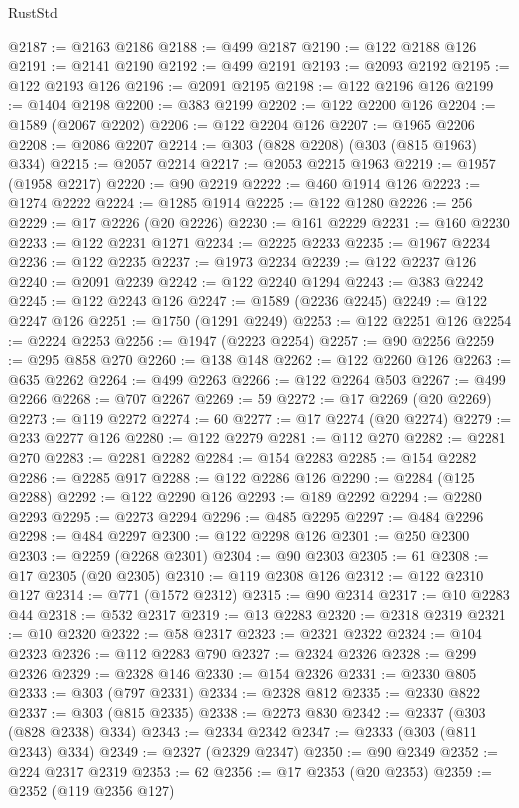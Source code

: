\begin{lexlean}{RustStd}
\begin{coremodule}
@2187 := @2163 @2186
@2188 := @499 @2187
@2190 := @122 @2188 @126
@2191 := @2141 @2190
@2192 := @499 @2191
@2193 := @2093 @2192
@2195 := @122 @2193 @126
@2196 := @2091 @2195
@2198 := @122 @2196 @126
@2199 := @1404 @2198
@2200 := @383 @2199
@2202 := @122 @2200 @126
@2204 := @1589 (@2067 @2202)
@2206 := @122 @2204 @126
@2207 := @1965 @2206
@2208 := @2086 @2207
@2214 := @303 (@828 @2208) (@303 (@815 @1963) @334)
@2215 := @2057 @2214
@2217 := @2053 @2215 @1963
@2219 := @1957 (@1958 @2217)
@2220 := @90 @2219
@2222 := @460 @1914 @126
@2223 := @1274 @2222
@2224 := @1285 @1914
@2225 := @122 @1280
@2226 := 256
@2229 := @17 @2226 (@20 @2226)
@2230 := @161 @2229
@2231 := @160 @2230
@2233 := @122 @2231 @1271
@2234 := @2225 @2233
@2235 := @1967 @2234
@2236 := @122 @2235
@2237 := @1973 @2234
@2239 := @122 @2237 @126
@2240 := @2091 @2239
@2242 := @122 @2240 @1294
@2243 := @383 @2242
@2245 := @122 @2243 @126
@2247 := @1589 (@2236 @2245)
@2249 := @122 @2247 @126
@2251 := @1750 (@1291 @2249)
@2253 := @122 @2251 @126
@2254 := @2224 @2253
@2256 := @1947 (@2223 @2254)
@2257 := @90 @2256
@2259 := @295 @858 @270
@2260 := @138 @148
@2262 := @122 @2260 @126
@2263 := @635 @2262
@2264 := @499 @2263
@2266 := @122 @2264 @503
@2267 := @499 @2266
@2268 := @707 @2267
@2269 := 59
@2272 := @17 @2269 (@20 @2269)
@2273 := @119 @2272
@2274 := 60
@2277 := @17 @2274 (@20 @2274)
@2279 := @233 @2277 @126
@2280 := @122 @2279
@2281 := @112 @270
@2282 := @2281 @270
@2283 := @2281 @2282
@2284 := @154 @2283
@2285 := @154 @2282
@2286 := @2285 @917
@2288 := @122 @2286 @126
@2290 := @2284 (@125 @2288)
@2292 := @122 @2290 @126
@2293 := @189 @2292
@2294 := @2280 @2293
@2295 := @2273 @2294
@2296 := @485 @2295
@2297 := @484 @2296
@2298 := @484 @2297
@2300 := @122 @2298 @126
@2301 := @250 @2300
@2303 := @2259 (@2268 @2301)
@2304 := @90 @2303
@2305 := 61
@2308 := @17 @2305 (@20 @2305)
@2310 := @119 @2308 @126
@2312 := @122 @2310 @127
@2314 := @771 (@1572 @2312)
@2315 := @90 @2314
@2317 := @10 @2283 @44
@2318 := @532 @2317
@2319 := @13 @2283
@2320 := @2318 @2319
@2321 := @10 @2320
@2322 := @58 @2317
@2323 := @2321 @2322
@2324 := @104 @2323
@2326 := @112 @2283 @790
@2327 := @2324 @2326
@2328 := @299 @2326
@2329 := @2328 @146
@2330 := @154 @2326
@2331 := @2330 @805
@2333 := @303 (@797 @2331)
@2334 := @2328 @812
@2335 := @2330 @822
@2337 := @303 (@815 @2335)
@2338 := @2273 @830
@2342 := @2337 (@303 (@828 @2338) @334)
@2343 := @2334 @2342
@2347 := @2333 (@303 (@811 @2343) @334)
@2349 := @2327 (@2329 @2347)
@2350 := @90 @2349
@2352 := @224 @2317 @2319
@2353 := 62
@2356 := @17 @2353 (@20 @2353)
@2359 := @2352 (@119 @2356 @127)

\end{coremodule}
\end{lexlean}
